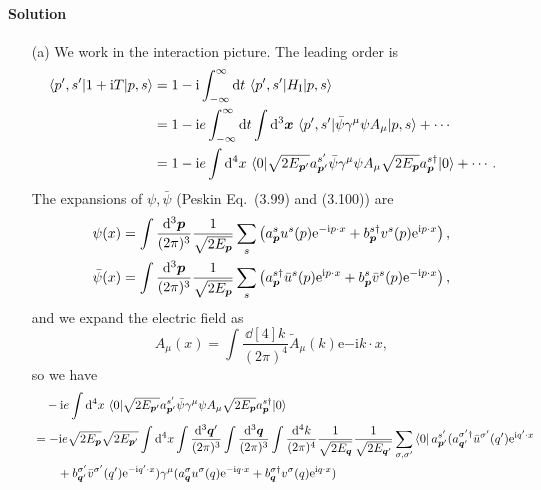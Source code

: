 \documentclass[hyperref, a4paper]{article}
\newcommand*{\ii}{\mathrm{i}}
\newcommand*{\ee}{\mathrm{e}}
\begin{document}
\paragraph{Solution} \begin{itemize}
\item[(a)] We work in the interaction picture. The leading order is 
\[
    \begin{aligned}
        \mel{p', s'}{ 1 + \ii T }{p, s} &= 1 - \ii \int_{-\infty}^\infty \dd{t} \mel{p', s'}{H_\text{I}}{p, s} \\
        &= 1 - \ii e \int_{-\infty}^\infty \dd{t} \int \dd[3]{\vb*{x}} \mel{p', s'}{\bar{\psi} \gamma^{\mu} \psi A_{\mu}}{p, s} + \cdots \\
        &= 1 - \ii e \int \dd[4]{x} \mel{0}{ \sqrt{2 E_{\vb*{p}'}} a_{\vb*{p}'}^{s'} \bar{\psi} \gamma^{\mu} \psi A_{\mu} \sqrt{2 E_{\vb*{p}}} a^{s\dagger}_{\vb*{p}} }{0} + \cdots.
    \end{aligned}
\] 
The expansions of $\psi, \bar{\psi}$ (Peskin Eq.~(3.99) and (3.100)) are 
\[
    \begin{aligned}
        \psi(x) &= \int \frac{\dd[3]{\vb*{p}}}{(2\pi)^3} \frac{1}{\sqrt{2 E_{\vb*{p}}}} \sum_s \left( a^s_{\vb*{p}} u^s(p) \ee^{- \ii p \cdot x} + b_{\vb*{p}}^{s\dagger} v^s(p) \ee^{\ii p \cdot x} \right), \\
        \bar{\psi}(x) &= \int \frac{\dd[3]{\vb*{p}}}{(2\pi)^3} \frac{1}{\sqrt{2 E_{\vb*{p}}}} \sum_s \left( a^{s \dagger}_{\vb*{p}} \bar{u}^s(p) \ee^{\ii p \cdot x} + b_{\vb*{p}}^{s} \bar{v}^s(p) \ee^{- \ii p \cdot x} \right) ,
    \end{aligned}
\]
and we expand the electric field as 
\[
    A_\mu(x) = \int \frac{\dd[4]{k}}{(2\pi)^4} \tilde{A}_\mu(k) \ee{- \ii k \cdot x},
\]
so we have 
\[
    \begin{aligned}
        &\quad - \ii e \int \dd[4]{x} \mel{0}{ \sqrt{2 E_{\vb*{p}'}} a_{\vb*{p}'}^{s'} \bar{\psi} \gamma^{\mu} \psi A_{\mu} \sqrt{2 E_{\vb*{p}}} a^{s\dagger}_{\vb*{p}} }{0} \\
        &= - \ii e \sqrt{2 E_{\vb*{p}}} \sqrt{2 E_{\vb*{p}'}} \int \dd[4]{x} \int \frac{\dd[3]{\vb*{q}'}}{(2\pi)^3} \int \frac{\dd[3]{\vb*{q}}}{(2\pi)^3} \int \frac{\dd[4]{k}}{(2\pi)^4} \frac{1}{\sqrt{2 E_{\vb*{q}}}} \frac{1}{\sqrt{2 E_{\vb*{q}'}}} \sum_{\sigma, \sigma'} \bra{0} a^{s'}_{\vb*{p}'} ( a^{\sigma' \dagger}_{\vb*{q}'} \bar{u}^{\sigma'}(q') \ee^{\ii q' \cdot x} \\
        &\quad \quad + b^{\sigma'}_{\vb*{q}'} \bar{v}^{\sigma'}(q') \ee^{- \ii q' \cdot x} ) \gamma^\mu ( a^\sigma_{\vb*{q}} u^\sigma(q) \ee^{- \ii q \cdot x} + b^{\sigma \dagger}_{\vb*{q}} v^\sigma(q) \ee^{\ii q \cdot x} ) 

\end{aligned}\]
\end{itemize}
\end{document}
